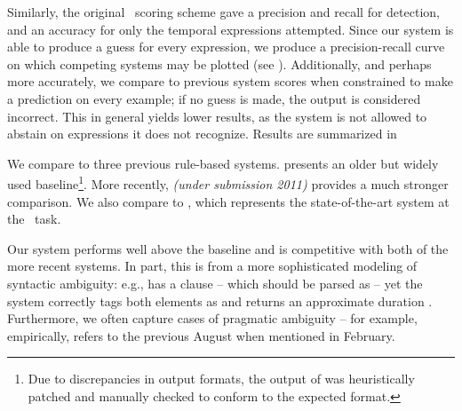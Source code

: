 
Similarly, the original \tempeval\ scoring scheme gave a precision 
	and recall for detection, and an accuracy for only the temporal expressions 
	attempted.
Since our system is able to produce a guess for every expression, we produce
	a precision-recall curve on which competing systems may be plotted
	(see ).
Additionally, and perhaps more accurately, we compare to 
	previous system scores when constrained to make a prediction on every
	example; if no guess is made, the output is considered incorrect.
This in general yields lower results, as the system is not allowed to
	abstain on expressions it does not recognize.
Results are summarized in 

We compare to three previous rule-based systems.
 \cite{key:2000mani-temporal} presents an older but widely
	used baseline\footnote{
		Due to discrepancies in output formats, 
			the output of  was heuristically patched
			and manually checked to conform to the expected format.
	}.
More recently,  \textit{(under submission 2011)} 
	provides a much stronger comparison.
We also compare to  \cite{key:2010strotgen-temporal}, 
	which represents the state-of-the-art system at the \tempeval\ task.

Our system performs well above the  baseline and is competitive
	with both of the more recent systems.
In part, this is from a more sophisticated modeling of syntactic ambiguity:
	e.g.,  has a clause  -- which
	should be parsed as  -- yet the system correctly tags both
	elements as  and returns an approximate duration .
Furthermore, we often capture cases of pragmatic ambiguity -- for example,
	empirically,  refers to the previous August when mentioned in
	February.



